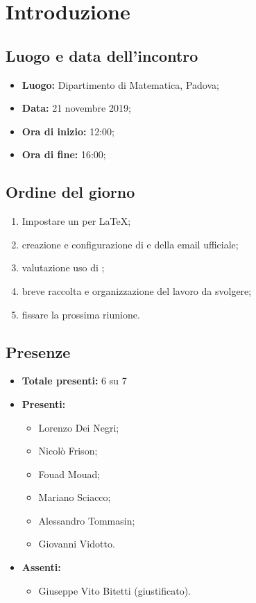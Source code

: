 \section*{Introduzione}

\subsection*{Luogo e data dell'incontro}
	\begin{itemize}
		\item \textbf{Luogo:} Dipartimento di Matematica, Padova;
		\item \textbf{Data:} 21 novembre 2019;
		\item \textbf{Ora di inizio:} 12:00;
		\item \textbf{Ora di fine:} 16:00;
	\end{itemize}

\subsection*{Ordine del giorno}
	\begin{enumerate}
		\item Impostare un  per \LaTeX{};
		\item creazione e configurazione di  e della email ufficiale;
		\item valutazione uso di ;
		\item breve raccolta e organizzazione del lavoro da svolgere;
		\item fissare la prossima riunione.
	\end{enumerate}

\subsection*{Presenze}
	\begin{itemize}
		\item \textbf{Totale presenti:} 6 su 7
		\item \textbf{Presenti: }
			\begin{itemize}
				\item Lorenzo Dei Negri;
				\item Nicolò Frison;
				\item Fouad Mouad;
				\item Mariano Sciacco;
				\item Alessandro Tommasin;
				\item Giovanni Vidotto.
			\end{itemize}
		\item \textbf{Assenti: }
			\begin{itemize}
				\item Giuseppe Vito Bitetti (giustificato).
			\end{itemize}
	\end{itemize}


